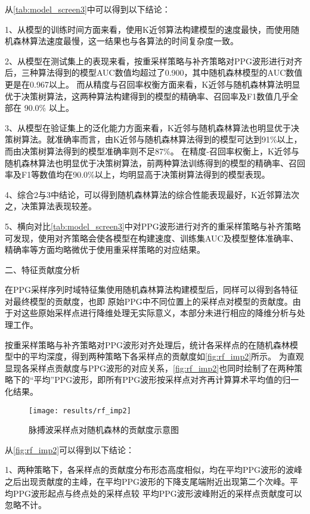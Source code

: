 从\autoref{tab:model_screen3}中可以得到以下结论：

1、从模型的训练时间方面来看，使用K近邻算法构建模型的速度最快，而使用随机森林算法速度最慢，这一结果也与各算法的时间复杂度一致。

2、从模型在测试集上的表现来看，按重采样策略与补齐策略对PPG波形进行对齐后，三种算法得到的模型AUC数值均超过了0.900，其中随机森林模型的AUC数值更是在0.967以上。
而从精度与召回率权衡方面来看，K近邻与随机森林算法明显优于决策树算法，这两种算法构建得到的模型的精确率、召回率及F1数值几乎全部在 90.0\% 以上。

3、从模型在验证集上的泛化能力方面来看，K近邻与随机森林算法也明显优于决策树算法。就准确率而言，由K近邻与随机森林算法得到的模型可达到91\%以上，而由决策树算法得到的模型准确率则不足87\%。
在精度-召回率权衡上，K近邻与随机森林算法也明显优于决策树算法，前两种算法训练得到的模型的精确率、召回率及F1等数值均在90.0\%以上，均明显高于决策树算法得到的模型表现。

4、综合2与3中结论，可以得到随机森林算法的综合性能表现最好，K近邻算法次之，决策算法表现较差。

5、横向对比\autoref{tab:model_screen3}中对PPG波形进行对齐的重采样策略与补齐策略可发现，使用对齐策略会使各模型在构建速度、训练集AUC及模型整体准确率、精确率等方面均略微优于使用重采样策略的对应结果。

二、特征贡献度分析

在PPG采样序列时域特征集使用随机森林算法构建模型后，同样可以得到各特征对最终模型的贡献度，也即
原始PPG中不同位置上的采样点对模型的贡献度。由于对这些原始采样点进行降维处理无实际意义，本部分未进行相应的降维分析与处理工作。

按重采样策略与补齐策略对PPG波形对齐处理后，统计各采样点的在随机森林模型中的平均深度，得到两种策略下各采样点的贡献度如\autoref{fig:rf_imp2}所示。
为直观显现各采样点贡献度与PPG波形的对应关系，\autoref{fig:rf_imp2}也同时绘制了在两种策略下的“平均”PPG波形，即所有PPG波形按采样点对齐再计算算术平均值的归一化结果。

\begin{figure}[htbp]
    \centering
    \texttt{[image: results/rf\_imp2]}
    \caption{\label{fig:rf_imp2}脉搏波采样点对随机森林的贡献度示意图}
\end{figure}

从\autoref{fig:rf_imp2}可以得到以下结论：

1、两种策略下，各采样点的贡献度分布形态高度相似，均在平均PPG波形的波峰之后出现贡献度的主峰，在平均PPG波形的下降支尾端附近出现第二个次峰。平均PPG波形起点与终点处的采样点较
平均PPG波形波峰附近的采样点贡献度可以忽略不计。

